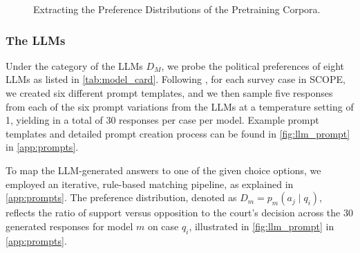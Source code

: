 \begin{figure*}[h]
\centering
{}

\caption{Extracting the Preference Distributions of the Pretraining Corpora.}
\label{fig:stance_score_ppl}
\end{figure*}
\vspace{-0.2cm}



\subsubsection{The LLMs}
\label{sec:llm_response_collection}
Under the category of the LLMs $D_M$, we probe the political preferences of eight LLMs as listed in \autoref{tab:model_card}. Following \citealt{NEURIPS2023_a2cf225b}, for each survey case in \textsc{SCOPE}, we created six different prompt templates, and we then sample five responses from each of the six prompt variations from the LLMs at a temperature setting of 1, yielding in a total of 30 responses per case per model.  Example prompt templates and detailed prompt creation process can be found in \autoref{fig:llm_prompt} in \autoref{app:prompts}. 

To map the LLM-generated answers to one of the given choice options, we employed an iterative, rule-based matching pipeline, as explained in \autoref{app:prompts}.
The preference distribution, denoted as $D_m = p_{m}(a_j \mid q_i)$, reflects the ratio of support versus opposition to the court's decision across the 30 generated responses for model $m$ on case $q_i$, illustrated in \autoref{fig:llm_prompt} in \autoref{app:prompts}.



